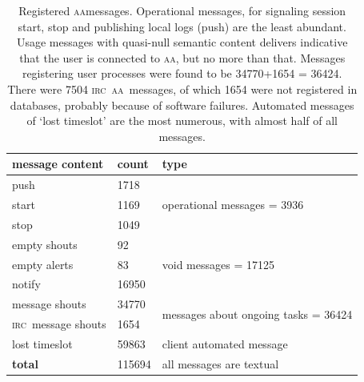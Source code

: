 \documentclass[a4paper, 11pt]{article} %
\newcommand{\irc}{\textsc{irc}}
\newcommand{\aab}{\textsc{aa}}
\begin{document}
\begin{table}[!h]
  \centering
  \caption{Registered \aab messages. Operational messages, for signaling session start, stop and publishing local logs (push) are the least abundant. Usage messages with quasi-null semantic content delivers indicative that the user is connected to \aab, but no more than that. Messages registering user processes were found to be 34770+1654 = 36424. There were 7504 \irc\ \aab\ messages, of which 1654 were not registered in databases, probably because of software failures. Automated messages of `lost timeslot' are the most numerous, with almost half of all messages. }\label{tab:msgTy}
  \begin{tabular}{|l|l|l|}\hline
      {\bf message content } & {\bf count} & {\bf type}   \\\hline\hline
 push & 1718 & \multirow{3}{*}{operational messages = 3936 } \\ 
start & 1169 & \\ 
 stop & 1049 & \\ \hline\hline
 empty shouts & 92    & \multirow{3}{*}{void messages = 17125} \\
 empty alerts & 83        &  \\
       notify & 16950     &  \\ \hline\hline
      message shouts & 34770 & \multirow{2}{*}{messages about ongoing tasks = 36424}  \\ 
      \irc\ message shouts & 1654 & \\ \hline
      lost timeslot & 59863 & client automated message \\ \hline\hline
      {\bf total} & 115694 & all messages are textual \\\hline
  \end{tabular}
\end{table}
\end{document}
